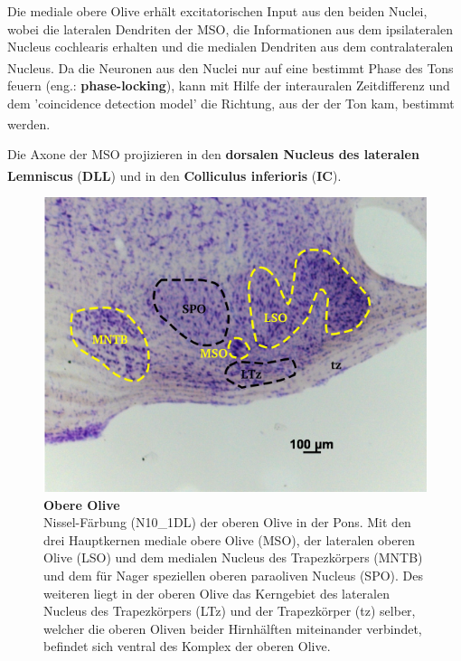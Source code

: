 \documentclass[12pt,a4paper,pdftex]{article}
\begin{document}
Die mediale obere Olive erhält excitatorischen Input aus den beiden Nuclei, wobei die lateralen Dendriten der MSO, die Informationen aus dem ipsilateralen Nucleus cochlearis erhalten und die medialen Dendriten aus dem contralateralen Nucleus\textsuperscript{\cite[29]{paxinos2014rat}}. Da die Neuronen aus den Nuclei nur auf eine bestimmt Phase des Tons feuern (eng.: \textbf{phase-locking}), kann mit Hilfe der interauralen Zeitdifferenz und dem 'coincidence detection model' die Richtung, aus der der Ton kam, bestimmt werden\textsuperscript{\cite[31]{kandel2013principles}}.

Die Axone der MSO projizieren in den \textbf{dorsalen Nucleus des lateralen Lemniscus} (\textbf{DLL}) und in den \textbf{Colliculus inferioris} (\textbf{IC})\textsuperscript{\cite[29]{paxinos2014rat}}.
\\

\begin{figure}[H]
    \centering
    \includegraphics{pictures/auditory/obere_olive.png}
    \caption[Obere Olive]{\textbf{Obere Olive}\\
    Nissel-Färbung (N10\_1DL) der oberen Olive in der Pons. Mit den drei Hauptkernen mediale obere Olive (MSO), der lateralen oberen Olive (LSO) und dem medialen Nucleus des Trapezkörpers (MNTB) und dem für Nager speziellen oberen paraoliven Nucleus (SPO). Des weiteren liegt in der oberen Olive das Kerngebiet des lateralen Nucleus des Trapezkörpers (LTz) und der Trapezkörper (tz) selber, welcher die oberen Oliven beider Hirnhälften miteinander verbindet, befindet sich ventral des Komplex der oberen Olive.}
    \label{fig:obere_Olive}
\end{figure}
\end{document}
